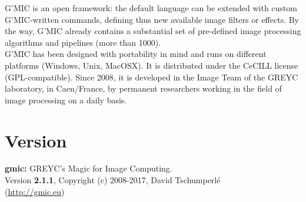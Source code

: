 \documentclass[a4paper,10.5pt,twoside]{book}
\newcommand{\Ca}[1]{\textcolor{ca}{#1}}
\newcommand{\Cb}[1]{\textcolor{cb}{#1}}
\newcommand{\Cc}[1]{\textcolor{cc}{#1}}
\begin{document}
\Cc{G'MIC} is an open framework: the default language can be extended with custom \Cc{G'MIC}-written commands, defining thus new available image filters or effects. By the way, \Cc{G'MIC} already contains a substantial set of pre-defined image processing algorithms and pipelines (more than 1000).\\ 
 
\Cc{G'MIC} has been designed with portability in mind and runs on different platforms (Windows, Unix, MacOSX). It is distributed under the CeCILL license (GPL-compatible). Since 2008, it is developed in the Image Team of the GREYC laboratory, in Caen/France, by permanent researchers working in the field of image processing on a daily basis. 
\section*{Version} 
 
 \Ca{\textbf{gmic:} GREYC's Magic for Image Computing.}\\ 
 
        \Cb{Version \textbf{2.1.1}, Copyright (c) 2008-2017, David Tschumperl\'e}\\ 
        \Cb{(\url{http://gmic.eu})} 
\end{document}
